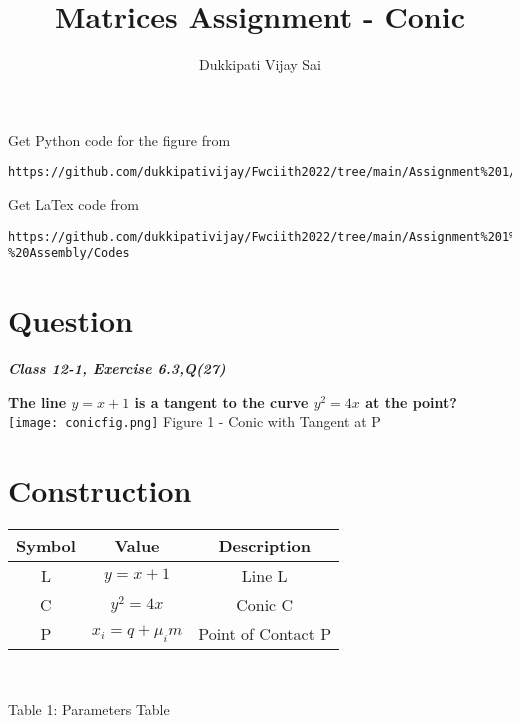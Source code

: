 \documentclass[journal,12pt,twocolumn]{IEEEtran}
\begin{document}
\makeatother
\let\StandardTheFigure\thefigure
\let\vec\mathbf
\renewcommand{\thefigure}{\theproblem}
\def\putbox#1#2#3{\makebox[0in][l]{\makebox[#1][l]{}\raisebox{\baselineskip}[0in][0in]{\raisebox{#2}[0in][0in]{#3}}}}
     \def\rightbox#1{\makebox[0in][r]{#1}}
     \def\centbox#1{\makebox[0in]{#1}}
     \def\topbox#1{\raisebox{-\baselineskip}[0in][0in]{#1}}
     \def\midbox#1{\raisebox{-0.5\baselineskip}[0in][0in]{#1}}
\vspace{3cm}
\title{\textbf{Matrices Assignment - Conic} }
\author{Dukkipati Vijay Sai}
\maketitle
\newpage
\bigskip
\renewcommand{\thefigure}{\theenumi}
\renewcommand{\thetable}{\theenumi}
Get Python code for the figure from 
\begin{lstlisting}
https://github.com/dukkipativijay/Fwciith2022/tree/main/Assignment%201/Codes/src
\end{lstlisting}
Get LaTex code from
\begin{lstlisting}
https://github.com/dukkipativijay/Fwciith2022/tree/main/Assignment%201%20-%20Assembly/Codes
\end{lstlisting}
%
\section{Question}
\centering
\textbf{\textit{Class 12-1, Exercise 6.3,Q(27)}}\\
\vspace{0.25cm}
\raggedright
\textbf{The line $y = x + 1$ is a tangent to the curve $y^2 = 4x$ at the point?} \\
\centering
\vspace{0.25cm}
\texttt{[image: conicfig.png]}
Figure 1 - Conic with Tangent at P

\section{Construction}
\vspace{0.25cm}
\raggedright
\centering
\begin{tabular}{|c|c|c|}
\hline
\textbf{Symbol} & \textbf{Value} & \textbf{Description}\\
\hline
L & $ y = x + 1 $ & Line L\\
\hline
C & $ y^2 = 4x$ & Conic C\\
\hline
P & $ x_i = q + \mu_i m$ & Point of Contact P\\
\hline
\end{tabular}\\
\vspace{0.2cm}
\centerline{Table 1: Parameters Table}
\end{document}

